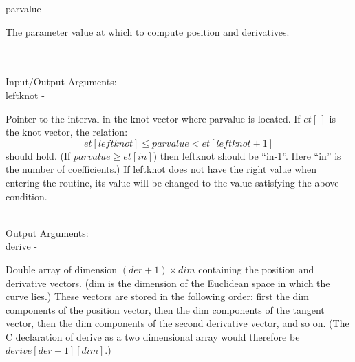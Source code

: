         \>\>    {\fov parvalue}\> - \>  \begin{minipg2}
                                The parameter value at which to compute position
                                and derivatives.
                                \end{minipg2}\\[0.3ex]
\\
        \>Input/Output Arguments:\\
        \>\>    {\fov leftknot}\> - \>  \begin{minipg2}
                                Pointer to the interval in the knot
                                vector where {\fov parvalue}
                                is located. If $et[\,]$ is the knot vector, the relation:\\
                                \[ et[leftknot] \leq parvalue < et[leftknot+1] \]
                                should hold. (If $parvalue\geq et[in]$)
                                then {\fov leftknot} should be
                                ``in-1''. Here ``in'' is the number of coefficients.)
                                If leftknot does not have the right value when entering
                                the routine, its value will be changed to the value
                                satisfying the above condition.
                                \end{minipg2}\\
\newpagetabs
        \>Output Arguments:\\
        \>\>    {\fov derive}   \> - \> \begin{minipg2}
                                        Double array of dimension $(der+1)\times dim$
                                        containing the position and derivative vectors.
                                        ({\fov dim} is
                                         the dimension of the Euclidean
                                        space in which the curve lies.) These vectors are
                                        stored in the following order: first the dim
                                        components of the position vector, then the dim
                                        components of the tangent vector, then the dim
                                        components of the second derivative vector, and so
                                        on. (The C declaration of derive as a two dimensional
                                        array would therefore be
                                        $derive[der+1][dim]$.)

                                \end{minipg2}\\[0.8ex]
